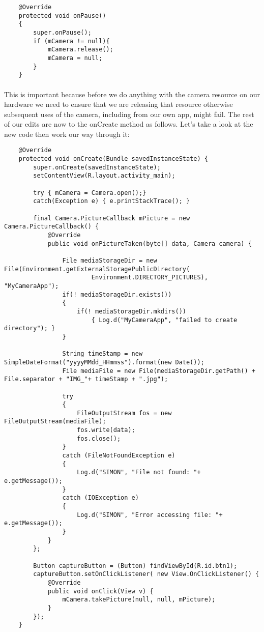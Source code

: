 \begin{lstlisting}
    @Override
    protected void onPause()
    {
        super.onPause();
        if (mCamera != null){
            mCamera.release();
            mCamera = null;
        }
    }
\end{lstlisting}

\paragraph{} This is important because before we do anything with the camera resource on our hardware we need to ensure that we are releasing that resource otherwise subsequent uses of the camera, including from our own app, might fail. The rest of our edits are now to the onCreate method as follows. Let's take a look at the new code then work our way through it:

\begin{lstlisting}
    @Override
    protected void onCreate(Bundle savedInstanceState) {
        super.onCreate(savedInstanceState);
        setContentView(R.layout.activity_main);

        try { mCamera = Camera.open();}
        catch(Exception e) { e.printStackTrace(); }

        final Camera.PictureCallback mPicture = new Camera.PictureCallback() {
            @Override
            public void onPictureTaken(byte[] data, Camera camera) {

                File mediaStorageDir = new File(Environment.getExternalStoragePublicDirectory(
                        Environment.DIRECTORY_PICTURES), "MyCameraApp");
                if(! mediaStorageDir.exists())
                {
                    if(! mediaStorageDir.mkdirs())
                        { Log.d("MyCameraApp", "failed to create directory"); }
                }

                String timeStamp = new SimpleDateFormat("yyyyMMdd_HHmmss").format(new Date());
                File mediaFile = new File(mediaStorageDir.getPath() + File.separator + "IMG_"+ timeStamp + ".jpg");

                try
                {
                    FileOutputStream fos = new FileOutputStream(mediaFile);
                    fos.write(data);
                    fos.close();
                }
                catch (FileNotFoundException e)
                {
                    Log.d("SIMON", "File not found: "+ e.getMessage());
                }
                catch (IOException e)
                {
                    Log.d("SIMON", "Error accessing file: "+ e.getMessage());
                }
            }
        };

        Button captureButton = (Button) findViewById(R.id.btn1);
        captureButton.setOnClickListener( new View.OnClickListener() {
            @Override
            public void onClick(View v) {
                mCamera.takePicture(null, null, mPicture);
            }
        });
    }
\end{lstlisting}

